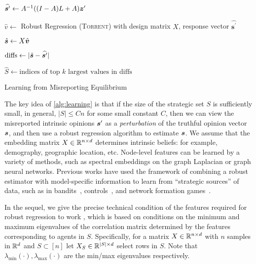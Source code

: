 \begin{algorithm}[t]
\SetAlgoLined
{}

$\widehat{\bm{s}^\prime} \leftarrow A^{-1}((I-A)L + A)\bm{z}^\prime$\;

$\hat{v} \leftarrow $ Robust Regression (\textsc{Torrent}) with design matrix $X$, response vector $\widehat{\bm{s}^\prime}$\;

$\hat {\bm{s}} \leftarrow X\hat{\bm{v}}$\;

$\text{diffs} \leftarrow \lvert\hat {\bm{s}} - \widehat{\bm{s}^\prime}\rvert$\;

$\hat S \leftarrow \text{indices of top } k \text{ largest values in diffs}$\;

\caption{Learning from Misreporting Equilibrium}
\label{alg:learning}
\end{algorithm}

The key idea of \cref{alg:learning} is that if the size of the strategic set $S$ is sufficiently small, in general, $|S| \le C n$ for some small constant $C$, then we can view the misreported intrinsic opinions $\bm{s}^\prime$ as a {\em perturbation} of the truthful opinion vector $\bm{s}$, and then use a robust regression algorithm to estimate $\bm{s}$. We assume that the embedding matrix $X \in \mathbb{R}^{n \times d}$ determines intrinsic beliefs: for example, demography, geographic location, etc. Node-level features can be learned by a variety of methods, such as spectral embeddings on the graph Laplacian or graph neural networks. Previous works have used the framework of combining a robust estimator with model-specific information to learn from ``strategic sources'' of data, such as in bandits~\cite{kapoor2019corruption}, controls~\cite{russo2023analysis}, and network formation games~\cite{jalan-chakrabarti-2024}. 

In the sequel, we give the precise technical condition of the features required for robust regression to work \citep{torrent-2015}, which is based on conditions on the minimum and maximum eigenvalues of the correlation matrix determined by the features corresponding to agents in $S$. Specifically, for a matrix $X \in \mathbb{R}^{n \times d}$ with $n$ samples in $\mathbb{R}^d$ and $S \subset [n]$ let $X_S \in \mathbb{R}^{\lvert S\rvert \times d}$ select rows in $S$. Note that $\lambda_{\min}(\cdot), \lambda_{\max}(\cdot)$ are the min/max eigenvalues respectively.

